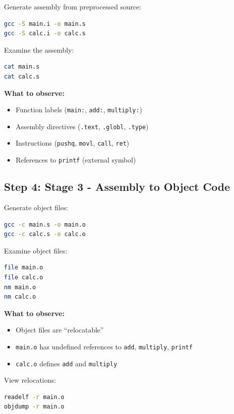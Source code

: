 Generate assembly from preprocessed source:

\begin{lstlisting}[language=bash]
gcc -S main.i -o main.s
gcc -S calc.i -o calc.s
\end{lstlisting}

Examine the assembly:

\begin{lstlisting}[language=bash]
cat main.s
cat calc.s
\end{lstlisting}

\textbf{What to observe:}
\begin{itemize}
\item Function labels (\texttt{main:}, \texttt{add:}, \texttt{multiply:})
\item Assembly directives (\texttt{.text}, \texttt{.globl}, \texttt{.type})
\item Instructions (\texttt{pushq}, \texttt{movl}, \texttt{call}, \texttt{ret})
\item References to \texttt{printf} (external symbol)
\end{itemize}

\subsection{Step 4: Stage 3 - Assembly to Object Code}

Generate object files:

\begin{lstlisting}[language=bash]
gcc -c main.s -o main.o
gcc -c calc.s -o calc.o
\end{lstlisting}

Examine object files:

\begin{lstlisting}[language=bash]
file main.o
file calc.o
nm main.o
nm calc.o
\end{lstlisting}

\textbf{What to observe:}
\begin{itemize}
\item Object files are ``relocatable''
\item \texttt{main.o} has undefined references to \texttt{add}, \texttt{multiply}, \texttt{printf}
\item \texttt{calc.o} defines \texttt{add} and \texttt{multiply}
\end{itemize}

View relocations:

\begin{lstlisting}[language=bash]
readelf -r main.o
objdump -r main.o
\end{lstlisting}

